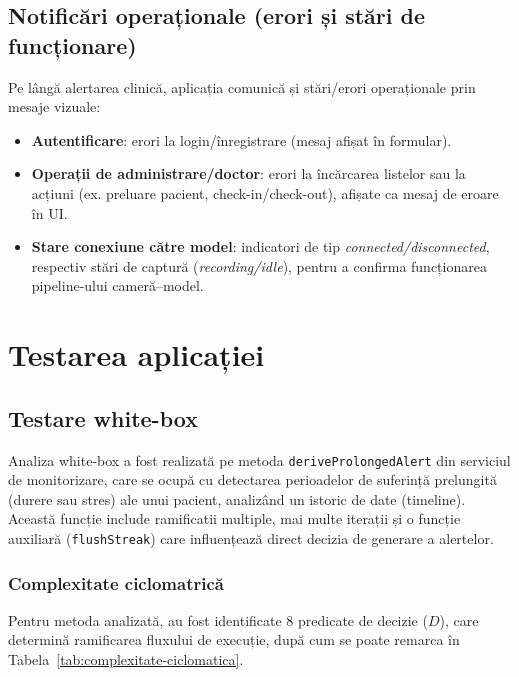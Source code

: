 \subsection*{Notificări operaționale (erori și stări de funcționare)}
\label{subsec:operational-notifications}

Pe lângă alertarea clinică, aplicația comunică și stări/erori operaționale prin mesaje vizuale:
\begin{itemize}
  \item \textbf{Autentificare}: erori la login/înregistrare (mesaj afișat în formular).
  \item \textbf{Operații de administrare/doctor}: erori la încărcarea listelor sau la acțiuni (ex. preluare pacient, check-in/check-out),
        afișate ca mesaj de eroare în UI.
  \item \textbf{Stare conexiune către model}: indicatori de tip \textit{connected/disconnected}, respectiv stări de captură (\textit{recording/idle}),
        pentru a confirma funcționarea pipeline-ului cameră--model.
\end{itemize}

\section{Testarea aplicației}

\subsection*{Testare white-box}
\label{subsec:whitebox-compact}

Analiza white-box a fost realizată pe metoda \texttt{deriveProlongedAlert} din serviciul de monitorizare, care se ocupă cu detectarea perioadelor de suferință prelungită (durere sau stres) ale unui pacient, analizând un istoric de date (timeline). Această funcție include ramificatii multiple, mai multe iterații și o funcție auxiliară (\texttt{flushStreak}) care influențează direct decizia de generare a alertelor.

\subsubsection{Complexitate ciclomatrică}

Pentru metoda analizată, au fost identificate 8 predicate de decizie ($D$), care determină ramificarea fluxului de execuție, după cum se poate remarca în Tabela~\ref{tab:complexitate-ciclomatica}.

